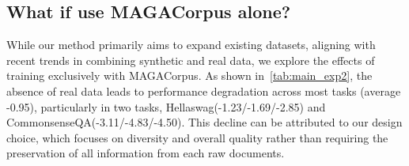    
    

\subsection{What if use MAGACorpus alone?}
While our method primarily aims to expand existing datasets, 
aligning with recent trends in combining synthetic and real data, 
we explore the effects of training exclusively with MAGACorpus. 
As shown in~\autoref{tab:main_exp2}, the absence of real data leads to performance degradation across most tasks (average -0.95), 
particularly in two tasks, Hellaswag(-1.23/-1.69/-2.85) and CommonsenseQA(-3.11/-4.83/-4.50). 
This decline can be attributed to our design choice, 
which focuses on diversity and overall quality rather than requiring the preservation of all information from each raw documents.

